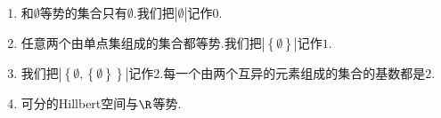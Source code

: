 \begin{example}{}{}
	\begin{enumerate}
		\item 和$\emptyset$等势的集合只有$\emptyset$.我们把$\left|\emptyset\right|$记作$0$.
		\item 任意两个由单点集组成的集合都等势.我们把$\left|\left\{\emptyset\right\}\right|$记作$1$.
		\item 我们把$\left|\left\{\emptyset,\left\{\emptyset\right\}\right\}\right|$记作$2$.每一个由两个互异的元素组成的集合的基数都是$2$.
		\item 可分的Hillbert空间与$\R$等势.
	\end{enumerate}
\end{example}
































































